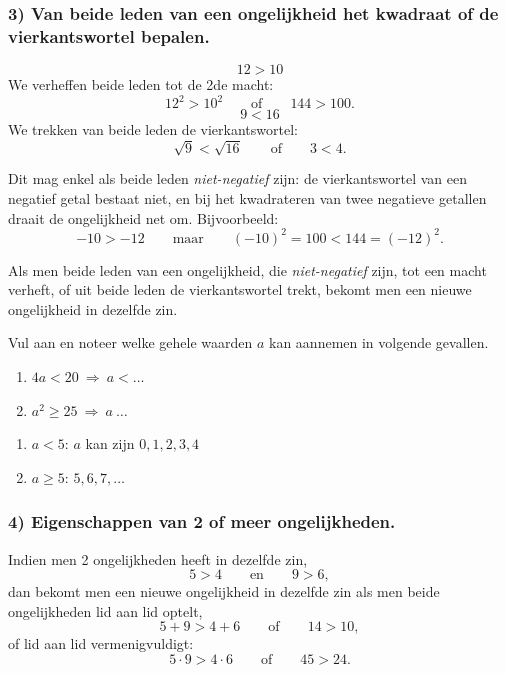 \documentclass{bis}
\begin{document}
\subsubsection*{3) Van beide leden van een ongelijkheid het kwadraat of de vierkantswortel bepalen.}
\[12>10\]
We verheffen beide leden tot de 2de macht:
\[12^2>10^2\qquad\text{of}\qquad144>100.\]
\[9<16\]
We trekken van beide leden de vierkantswortel:
\[\sqrt9<\sqrt{16}\qquad\text{of}\qquad3<4.\]

Dit mag enkel als beide leden \emph{niet-negatief} zijn: de vierkantswortel van een negatief
getal bestaat niet, en bij het kwadrateren van twee negatieve getallen draait de ongelijkheid
net om. Bijvoorbeeld:
\[-10>-12\qquad\text{maar}\qquad(-10)^2=100<144=(-12)^2.\]
\begin{onthoud}
Als men beide leden van een ongelijkheid, die \emph{niet-negatief} zijn, tot een macht verheft,
of uit beide leden de vierkantswortel trekt, bekomt men een nieuwe ongelijkheid in dezelfde zin.
\end{onthoud}

\begin{exercise}
Vul aan en noteer welke gehele waarden $a$ kan aannemen in volgende gevallen.
\begin{enumerate}
  \item $4a<20\ \Rightarrow\ a<\ldots$
  \item $a^2\geq25\ \Rightarrow\ a\ \ldots$
\end{enumerate}
\end{exercise}

\begin{solution}
\begin{enumerate}
  \item $a<5$: $a$ kan zijn $0,1,2,3,4$
  \item $a\geq5$: $5,6,7,\ldots$
\end{enumerate}
\end{solution}

\subsubsection*{4) Eigenschappen van 2 of meer ongelijkheden.}
Indien men 2 ongelijkheden heeft in dezelfde zin,
\[5>4\qquad\text{en}\qquad9>6,\]
dan bekomt men een nieuwe ongelijkheid in dezelfde zin als men beide ongelijkheden lid aan lid
optelt,
\[5+9>4+6\qquad\text{of}\qquad14>10,\]
of lid aan lid vermenigvuldigt:
\[5\cdot9>4\cdot6\qquad\text{of}\qquad45>24.\]
\end{document}
